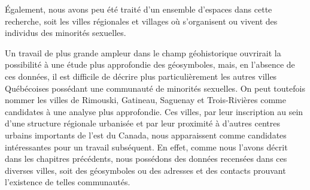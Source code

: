 Également, nous avons peu été traité d'un ensemble d'espaces dans cette recherche, soit les villes régionales et villages où s'organisent ou vivent des individus des minorités sexuelles. 


Un travail de plus grande ampleur dans le champ géohistorique ouvrirait la possibilité à une étude plus approfondie des géosymboles, mais, en l'absence de ces données, il est difficile de décrire plus particulièrement les autres villes Québécoises possédant une communauté de minorités sexuelles. 
On peut toutefois nommer les villes de Rimouski, Gatineau, Saguenay et Trois-Rivières comme candidates à une analyse plus approfondie. 
Ces villes, par leur inscription au sein d'une structure régionale urbanisée et par leur proximité à d'autres centres urbains importants de l'est du Canada, nous apparaissent comme candidates intéressantes pour un travail subséquent. 
En effet, comme nous l'avons décrit dans les chapitres précédents, nous possédons des données recensées dans ces diverses villes, soit des géosymboles ou des adresses et des contacts prouvant l'existence de telles communautés.


